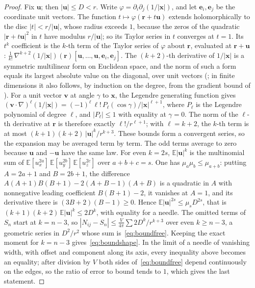 \documentclass[11pt]{amsart}
\theoremstyle{plain}
\theoremstyle{definition}
\theoremstyle{remark}
\begin{document}
\begin{proof}
Fix $\mathbf u$; then $|\mathbf u|\le D<r$. Write
$\varphi=\partial_i\partial_j(1/|\mathbf x|)$, and let $\mathbf e_i,\mathbf e_j$ be
the coordinate unit vectors. The function $t\mapsto\varphi(\mathbf r+t\mathbf u)$
extends holomorphically to the disc $|t|<r/|\mathbf u|$, whose radius exceeds $1$,
because the zeros of the quadratic $|\mathbf r+t\mathbf u|^2$ in $t$ have modulus
$r/|\mathbf u|$; so its Taylor series in $t$ converges at $t=1$. Its $t^k$
coefficient is the $k$-th term of the Taylor series of $\varphi$ about
$\mathbf r$, evaluated at $\mathbf r+\mathbf u$:
$\tfrac1{k!}\,\nabla^{k+2}(1/|\mathbf x|)(\mathbf r)[\mathbf u,\dots,\mathbf u,
\mathbf e_i,\mathbf e_j]$. The $(k+2)$-th derivative of $1/|\mathbf x|$ is a
symmetric multilinear form on Euclidean space, and the norm of such a form equals
its largest absolute value on the diagonal, over unit vectors
(\cite[Satz~I]{Banach1938}; in finite dimensions it also follows, by induction on
the degree, from the gradient bound of \cite[Theorem~IV]{Kellogg1928}). For a
unit vector $\mathbf v$ at angle $\gamma$ to $\mathbf x$, the Legendre generating
function gives
$(\mathbf v\cdot\nabla)^{\ell}(1/|\mathbf x|)=(-1)^{\ell}\,\ell!\,P_{\ell}(\cos\gamma)/|\mathbf x|^{\ell+1}$,
where $P_{\ell}$ is the Legendre polynomial of degree $\ell$, and
$|P_{\ell}|\le 1$ with equality at $\gamma=0$. The norm of the $\ell$-th derivative
at $\mathbf r$ is therefore exactly $\ell!/r^{\ell+1}$; with $\ell=k+2$, the
$k$-th term is at most $(k+1)(k+2)\,|\mathbf u|^k/r^{k+3}$.
These bounds form a convergent series, so the expansion may be averaged term by
term. The odd terms average to zero because $\mathbf u$ and $-\mathbf u$ have the
same law. For even $k=2s$, $\mathbb E|\mathbf u|^k$ is the multinomial sum of
$\mathbb E[u_x^{2a}]\,\mathbb E[u_y^{2b}]\,\mathbb E[u_z^{2c}]$ over $a+b+c=s$.
One has $\mu_a\mu_b\le\mu_{a+b}$: putting
$A=2a+1$ and $B=2b+1$, the difference $A(A+1)B(B+1)-2(A+B-1)(A+B)$ is a
quadratic in $A$ with nonnegative leading coefficient $B(B+1)-2$, it vanishes at
$A=1$, and its derivative there is $(3B+2)(B-1)\ge 0$. Hence
$\mathbb E|\mathbf u|^{2s}\le\mu_s D^{2s}$, that is
$(k+1)(k+2)\,\mathbb E|\mathbf u|^k\le 2D^k$, with equality for a needle. The
omitted terms of $S_n$ start at $k=n-3$, so
$|N_{ij}-S_n|\le\frac{V}{4\pi}\sum 2D^k/r^{k+3}$ over even $k\ge n-3$, a
geometric series in $D^2/r^2$ whose sum is~\eqref{eq:boundfree}. Keeping the
exact moment for $k=n-3$ gives~\eqref{eq:boundshape}. In the limit of a needle
of vanishing width, with offset and component along its axis, every inequality
above becomes an equality; after division by $V$ both sides
of~\eqref{eq:boundfree} depend continuously on the edges, so the ratio of error
to bound tends to $1$, which gives the last statement.
\end{proof}
\end{document}
